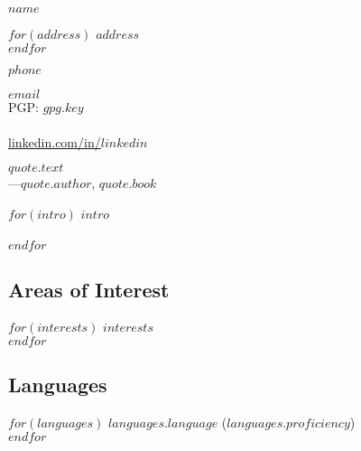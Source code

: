 \documentclass[$fontsize$, a4paper]{article}
\begin{document}
{\LARGE $name$}\\[.2cm]


\begin{multicols}{2}

$for(address)$
$address$\\
$endfor$

\vspace{-10pt}

$phone$

\columnbreak

\href{mailto:$email$}{$email$}\\
PGP: \href{$gpg.url$}{$gpg.key$}\\\\
\href{http://linkedin.com/in/$linkedin$}{linkedin.com/in/$linkedin$}


\end{multicols}

\vspace{-5pt}

\begin{changemargin}{0.5cm}{0.5cm}
\begin{center}
\begin{scriptsize}
\emph{$quote.text$}\\
—$quote.author$, \emph{$quote.book$}\\
\end{scriptsize}
\end{center}
\end{changemargin}

$for(intro)$
$intro$\\\\
$endfor$

\vspace{-20pt}

\begin{multicols}{2}

\subsection*{Areas of Interest}
$for(interests)$
$interests$\\
$endfor$

\columnbreak

\subsection*{Languages}
$for(languages)$
\emph{$languages.language$} ($languages.proficiency$)\\
$endfor$

\end{multicols}
\end{document}
